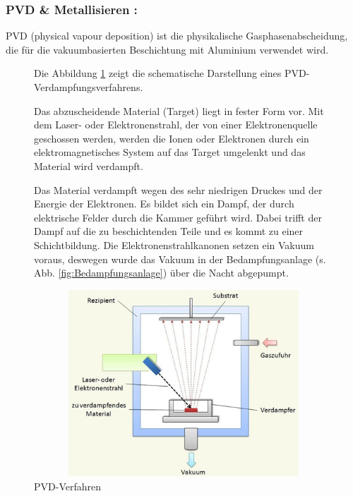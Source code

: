 \subsubsection[PVD \& Metallisieren ]{PVD \& Metallisieren : }

 PVD (physical vapour deposition) ist die physikalische Gasphasenabscheidung, die für die vakuumbasierten  Beschichtung mit Aluminium verwendet wird.
\begin{figure}[H]
\begin{minipage}[hbt]{9cm}

Die Abbildung \ref{fig:SchematischeDarstellungeinesPVD-Verdampfungsverfahrens} zeigt die schematische Darstellung eines PVD-Verdampfungsverfahrens.

Das abzuscheidende Material (Target) liegt in fester Form vor. Mit dem Laser- oder Elektronenstrahl, der von einer Elektronenquelle geschossen werden, werden die Ionen oder Elektronen durch ein elektromagnetisches System auf das Target umgelenkt und das Material wird verdampft.

Das  Material verdampft  wegen des sehr niedrigen Druckes und der Energie der Elektronen. Es bildet sich ein Dampf, der durch elektrische Felder durch die Kammer geführt wird. Dabei trifft  der Dampf auf die zu beschichtenden Teile und es kommt zu einer Schichtbildung.
Die Elektronenstrahlkanonen setzen ein Vakuum voraus, deswegen wurde das Vakuum in der Bedampfungsanlage (s. Abb. \ref{fig:Bedampfungsanlage}) über die Nacht abgepumpt.

\end{minipage}
\begin{minipage}[hbt]{6cm}
    \centering
    \includegraphics[width=1\textwidth,height=7cm]{bilder/SchematischeDarstellungeinesPVD-Verdampfungsverfahrens.png}
  \caption{PVD-Verfahren}
  \label{fig:SchematischeDarstellungeinesPVD-Verdampfungsverfahrens}
\end{minipage}

\end{figure}

